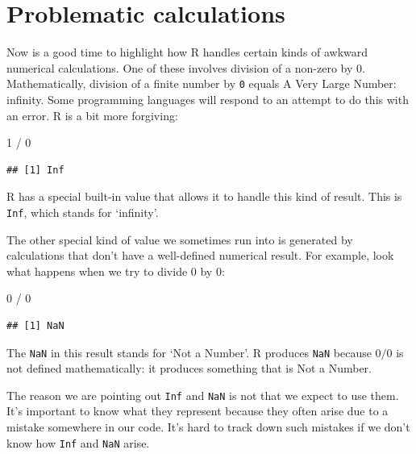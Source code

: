 \documentclass[
]{book}
\newenvironment{Shaded}{\begin{snugshade}}{\end{snugshade}}
\newcommand{\DecValTok}[1]{\textcolor[rgb]{0.00,0.00,0.81}{#1}}
\newcommand{\SpecialCharTok}[1]{\textcolor[rgb]{0.00,0.00,0.00}{#1}}
\begin{document}
\hypertarget{problematic-calculations}{%
\section{Problematic calculations}\label{problematic-calculations}}

Now is a good time to highlight how R handles certain kinds of awkward numerical calculations. One of these involves division of a non-zero by 0. Mathematically, division of a finite number by \texttt{0} equals A Very Large Number: infinity. Some programming languages will respond to an attempt to do this with an error. R is a bit more forgiving:

\begin{Shaded}
\begin{Highlighting}[]
\DecValTok{1} \SpecialCharTok{/} \DecValTok{0}
\end{Highlighting}
\end{Shaded}

\begin{verbatim}
## [1] Inf
\end{verbatim}

R has a special built-in value that allows it to handle this kind of result. This is \texttt{Inf}, which stands for `infinity'.

The other special kind of value we sometimes run into is generated by calculations that don't have a well-defined numerical result. For example, look what happens when we try to divide 0 by 0:

\begin{Shaded}
\begin{Highlighting}[]
\DecValTok{0} \SpecialCharTok{/} \DecValTok{0}
\end{Highlighting}
\end{Shaded}

\begin{verbatim}
## [1] NaN
\end{verbatim}

The \texttt{NaN} in this result stands for `Not a Number'. R produces \texttt{NaN} because \(0 / 0\) is not defined mathematically: it produces something that is Not a Number.

The reason we are pointing out \texttt{Inf} and \texttt{NaN} is not that we expect to use them. It's important to know what they represent because they often arise due to a mistake somewhere in our code. It's hard to track down such mistakes if we don't know how \texttt{Inf} and \texttt{NaN} arise.
\end{document}
